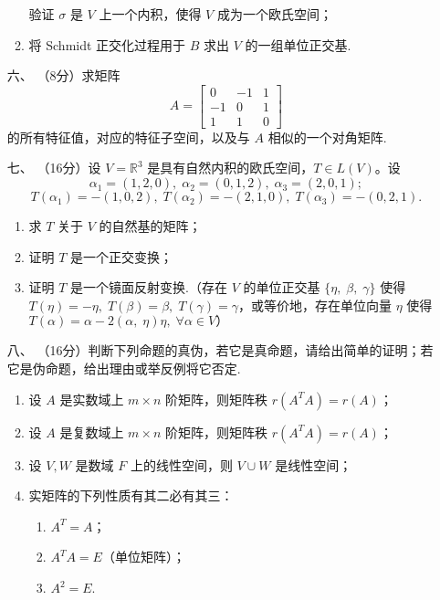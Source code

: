 \begin{enumerate}
\begin{enumerate}[label=(\arabic*)]
        验证 $\sigma$ 是 $V$ 上一个内积，使得 $V$ 成为一个欧氏空间；
        \item 将 Schmidt 正交化过程用于 $B$ 求出 $V$ 的一组单位正交基.
    \end{enumerate}
	\item[六、]（8分）求矩阵
	\[A=\left[\begin{array}{ccc}
    0 & -1 & 1 \\
    -1 & 0 & 1 \\
    1 & 1 & 0
    \end{array}\right]\]
    的所有特征值，对应的特征子空间，以及与 $A$ 相似的一个对角矩阵.
	\item[七、]（16分）设 $V=\mathbb{R}^3$ 是具有自然内积的欧氏空间，$T \in L(V)$。设
	\[\alpha_1=(1,2,0), \;\alpha_2=(0,1,2), \;\alpha_3=(2,0,1);\]
    \[T\left(\alpha_1\right)=-(1,0,2), \;T\left(\alpha_2\right)=-(2,1,0), \;T\left(\alpha_3\right)=-(0,2,1).\]
    \begin{enumerate}[label=(\arabic*)]
        \item 求 $T$ 关于 $V$ 的自然基的矩阵；
        \item 证明 $T$ 是一个正交变换；
        \item 证明 $T$ 是一个镜面反射变换.（存在 $V$ 的单位正交基 $\{\eta,\; \beta,\; \gamma\}$ 使得 $T(\eta)=-\eta,\; T(\beta)=\beta,\; T(\gamma)=\gamma$，或等价地，存在单位向量 $\eta$ 使得 $T(\alpha)=\alpha-2(\alpha,\; \eta) \eta,\; \forall \alpha \in V）$
    \end{enumerate}
	\item[八、]（16分）判断下列命题的真伪，若它是真命题，请给出简单的证明；若它是伪命题，给出理由或举反例将它否定.
    \begin{enumerate}[label=(\arabic*)]
        \item 设 $A$ 是实数域上 $m \times n$ 阶矩阵，则矩阵秩 $r\left(A^T A\right)=r(A)$；
        \item 设 $A$ 是复数域上 $m \times n$ 阶矩阵，则矩阵秩 $r\left(A^T A\right)=r(A)$；
        \item 设 $V, W$ 是数域 $F$ 上的线性空间，则 $V \cup W$ 是线性空间；
        \item 实矩阵的下列性质有其二必有其三：
        \begin{enumerate}
            \item $A^T=A$；
            \item $A^T A=E$（单位矩阵）；
            \item $A^2=E$.
        \end{enumerate}
    \end{enumerate}
\end{enumerate}

\newpage
